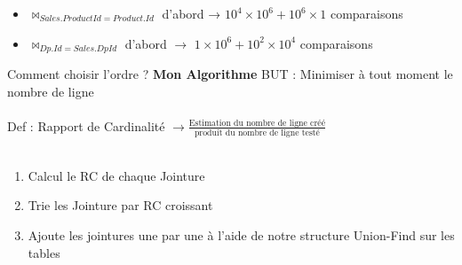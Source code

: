 \documentclass[aspectratio=43,12pt]{beamer}
\begin{document}
\begin{frame}
\begin{minipage}{0.48\textwidth}
    \end{minipage}


    \vspace{1cm}
    \begin{itemize}
        \item \(\Join_{Sales.ProductId = Product.Id}\) d'abord → \(10^4\times10^6 + 10^6 \times 1 \) comparaisons
        \item \(\Join_{Dp.Id = Sales.DpId}\) d'abord \(\rightarrow\) \(1\times10^6 + 10^2 \times 10^4 \) comparaisons
    \end{itemize}

\end{frame}

\begin{frame}{Comment choisir l'ordre ?}
    {\textbf{Mon Algorithme}}
    BUT : Minimiser à tout moment le nombre de ligne
    ~\\~\\
    Def : Rapport de Cardinalité \( \to \frac{\text{Estimation du nombre de ligne créé}}{\text{produit du nombre de ligne testé}}\)
    ~\\~\\\begin{enumerate}
        \item Calcul le RC de chaque Jointure
        \item Trie les Jointure par RC croissant
        \item Ajoute les jointures une par une à l'aide de notre structure Union-Find sur les tables
    \end{enumerate}
\end{frame}
\end{document}

